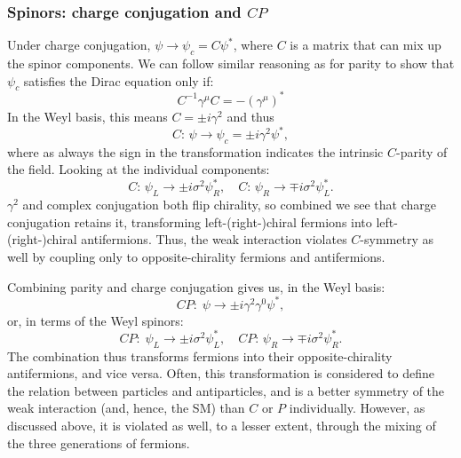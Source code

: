 \subsubsection{Spinors: charge conjugation and $CP$}

Under charge conjugation, $\psi \rightarrow \psi_c = C\psi^*$, where $C$ is a matrix that can mix up the spinor components.
We can follow similar reasoning as for parity to show that $\psi_c$ satisfies the Dirac equation only if:
\begin{equation}
	\label{eq:01_qft_spinors_cpt_charge_operator}
	C^{-1}\gamma^\mu C = -(\gamma^\mu)^*
\end{equation}
In the Weyl basis, this means $C = \pm i \gamma^2$ and thus
\begin{equation}
	\label{eq:01_qft_spinors_cpt_charge_conjugation}
	C\mathrm{:\,} \psi \rightarrow \psi_c = \pm i\gamma^2\psi^*,
\end{equation}
where as always the sign in the transformation indicates the intrinsic $C$-parity of the field.
Looking at the individual components:
\begin{equation}
	\label{eq:01_qft_spinors_cpt_charge_conjugation_weyl}
	C\mathrm{:\,} \psi_L \rightarrow \pm i\sigma^2\psi_R^*, \quad C\mathrm{:\,} \psi_R \rightarrow \mp i\sigma^2\psi_L^*.
\end{equation}
$\gamma^2$ and complex conjugation both flip chirality, so combined we see that charge conjugation retains it, transforming left-(right-)chiral fermions into left-(right-)chiral antifermions.
Thus, the weak interaction violates $C$-symmetry as well by coupling only to opposite-chirality fermions and antifermions.

Combining parity and charge conjugation gives us, in the Weyl basis:
\begin{equation}
	\label{eq:01_qft_spinors_cpt_cp}
	CP\mathrm{:\;} \psi \rightarrow \pm i \gamma^2\gamma^0\psi^*,
\end{equation}
or, in terms of the Weyl spinors:
\begin{equation}
	\label{eq:01_qft_spinors_cpt_cp_weyl}
	CP\mathrm{:\;} \psi_L \rightarrow \pm i\sigma^2\psi_L^*, \quad CP\mathrm{:\,} \psi_R \rightarrow \mp i\sigma^2\psi_R^*.
\end{equation}
The combination thus transforms fermions into their opposite-chirality antifermions, and vice versa.
Often, this transformation is considered to define the relation between particles and antiparticles, and is a better symmetry of the weak interaction (and, hence, the SM) than $C$ or $P$ individually.
However, as discussed above, it is violated as well, to a lesser extent, through the mixing of the three generations of fermions.


